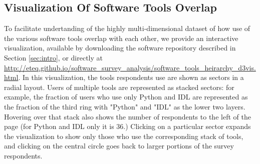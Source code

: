 \subsection{Visualization Of Software Tools Overlap}
\label{ssec:d3viz}

To facilitate undertanding of the highly multi-dimensional dataset of how use of the various software tools overlap with each other, we provide an interactive visualization, available by downloading the software repository described in Section \ref{sec:intro}, or directly at \url{http://eteq.github.io/software_survey_analysis/software_tools_heirarchy_d3vis.html}. In this visualization, the tools respondents use are shown as sectors in a radial layout.  Users of multiple tools are represented as stacked sectors: for example, the fraction of users who use only Python and IDL are represented as the fraction of the third ring with "Python" and "IDL" as the lower two layers.  Hovering over that stack also shows the number of respondents to the left of the page (for Python and IDL only it is 36.)  Clicking on a particular sector expands the visualization to show only those who use the corresponding stack of tools, and clicking on the central circle goes back to larger portions of the survey respondents.